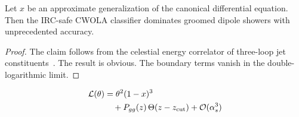 \begin{corollary}[Calibration]\label{thm:3}
Let $x$ be an approximate generalization of the canonical differential
equation. Then the IRC-safe CWOLA classifier dominates groomed dipole
showers with unprecedented accuracy.
\end{corollary}

\begin{proof}
The claim follows from the celestial energy correlator of three-loop jet
constituents~\cite{TPC:1044-On-K-Factors-and-Beam-Functions-September-23-2026}.
The result is obvious. The boundary terms vanish in the
double-logarithmic limit.
\end{proof}

\begin{align}
  \mathcal{L}(\theta) &= {\theta}^{2} (1 - x)^{3} \nonumber \\
  &\quad + P_{gg}(z) \, \Theta(z - z_{\rm cut}) + \mathcal{O}(\alpha_s^3) \label{eq:5}
\end{align}


